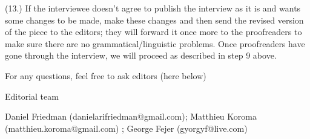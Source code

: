 \documentclass[11pt]{article}
\begin{document}
(13.) If the interviewee doesn’t agree to publish the interview as it is and wants some changes to be made, make these changes and then send the revised version of the piece to the editors; they will forward it once more to the proofreaders to make sure there are no grammatical/linguistic problems. Once proofreaders have gone through the interview, we will proceed as described in step 9 above.\par

For any questions, feel free to ask editors (here below)\par

Editorial team\par

Daniel Friedman (danielarifriedman@gmail.com); Matthieu Koroma (matthieu.koroma@gmail.com) ; George Fejer (gyorgyf@live.com)\par
\end{document}
